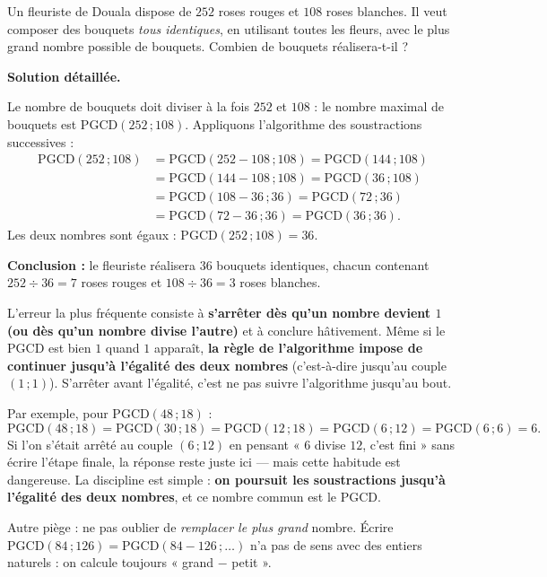\documentclass[11pt]{article}
\newcounter{popsec}
\newcounter{popsub}
\newcommand{\courssub}[1]{%
  \stepcounter{popsub}%
  \par\vspace{9pt}\noindent{\popxbold\fontsize{11.5}{13}\selectfont\color{popink}{\color{poporange}\thepopsec.\thepopsub}\hspace{6pt}#1}\par\nopagebreak\vspace{4pt}
}
\begin{document}
\begin{exoresolu}
Un fleuriste de Douala dispose de $252$ roses rouges et $108$ roses blanches. Il veut composer des bouquets \emph{tous identiques}, en utilisant toutes les fleurs, avec le plus grand nombre possible de bouquets. Combien de bouquets réalisera-t-il ?

\tcblower

\textbf{Solution détaillée.}

Le nombre de bouquets doit diviser à la fois $252$ et $108$ : le nombre maximal de bouquets est $\mathrm{PGCD}(252\,;108)$. Appliquons l'algorithme des soustractions successives :
\begin{align*}
\mathrm{PGCD}(252\,;108) &= \mathrm{PGCD}(252-108\,;108) = \mathrm{PGCD}(144\,;108)\\
&= \mathrm{PGCD}(144-108\,;108) = \mathrm{PGCD}(36\,;108)\\
&= \mathrm{PGCD}(108-36\,;36) = \mathrm{PGCD}(72\,;36)\\
&= \mathrm{PGCD}(72-36\,;36) = \mathrm{PGCD}(36\,;36).
\end{align*}
Les deux nombres sont égaux : $\mathrm{PGCD}(252\,;108) = 36$.

\textbf{Conclusion :} le fleuriste réalisera $36$ bouquets identiques, chacun contenant $252 \div 36 = 7$ roses rouges et $108 \div 36 = 3$ roses blanches.
\end{exoresolu}

\courssub{Pièges et erreurs fréquentes}

\begin{attention}
L'erreur la plus fréquente consiste à \textbf{s'arrêter dès qu'un nombre devient $1$ (ou dès qu'un nombre divise l'autre)} et à conclure hâtivement. Même si le PGCD est bien $1$ quand $1$ apparaît, \textbf{la règle de l'algorithme impose de continuer jusqu'à l'égalité des deux nombres} (c'est-à-dire jusqu'au couple $(1\,;1)$). S'arrêter avant l'égalité, c'est ne pas suivre l'algorithme jusqu'au bout.

Par exemple, pour $\mathrm{PGCD}(48\,;18)$ :
\[ \mathrm{PGCD}(48\,;18) = \mathrm{PGCD}(30\,;18) = \mathrm{PGCD}(12\,;18) = \mathrm{PGCD}(6\,;12) = \mathrm{PGCD}(6\,;6) = 6. \]
Si l'on s'était arrêté au couple $(6\,;12)$ en pensant « $6$ divise $12$, c'est fini » sans écrire l'étape finale, la réponse reste juste ici — mais cette habitude est dangereuse. La discipline est simple : \textbf{on poursuit les soustractions jusqu'à l'égalité des deux nombres}, et ce nombre commun est le PGCD.

Autre piège : ne pas oublier de \emph{remplacer le plus grand} nombre. Écrire $\mathrm{PGCD}(84\,;126) = \mathrm{PGCD}(84-126\,;\ldots)$ n'a pas de sens avec des entiers naturels : on calcule toujours « grand $-$ petit ».
\end{attention}
\end{document}
